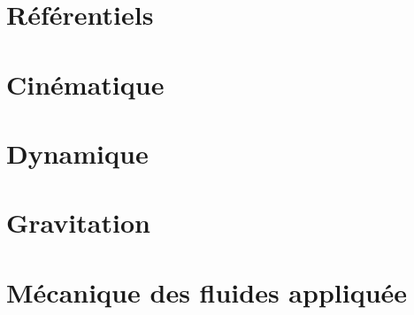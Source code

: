 \chapter{Référentiels}


\chapter{Cinématique}


\chapter{Dynamique}


\chapter{Gravitation}


\chapter{Mécanique des fluides appliquée}

